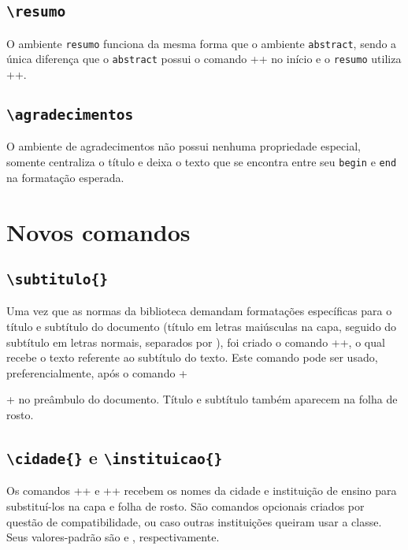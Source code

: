 \documentclass[xindy,draft]{fei}
\begin{document}
    \subsection{\texttt{\textbackslash resumo}}
    O ambiente \texttt{resumo} funciona da mesma forma que o ambiente \texttt{abstract}, sendo a única diferença que o \texttt{abstract} possui o comando \latexinline++ no início e o \texttt{resumo} utiliza \latexinline++.

    \subsection{\texttt{\textbackslash agradecimentos}}
    O ambiente de agradecimentos não possui nenhuma propriedade especial, somente centraliza o título e deixa o texto que se encontra entre seu \texttt{begin} e \texttt{end} na formatação esperada.

\section{Novos comandos}
    
    \subsection{\texttt{\textbackslash subtitulo\{\}}}
    Uma vez que as normas da biblioteca demandam formatações específicas para o título e subtítulo do documento (título em letras maiúsculas na capa, seguido do subtítulo em letras normais, separados por \aspas{:}), foi criado o comando \latexinline+\subtitulo{}+, o qual recebe o texto referente ao subtítulo do texto. Este comando pode ser usado, preferencialmente, após o comando \latexinline+\title{}+ no preâmbulo do documento. Título e subtítulo também aparecem na folha de rosto.
    
    \subsection{\texttt{\textbackslash cidade\{\}} e \texttt{\textbackslash instituicao\{\}}}
    Os comandos \latexinline+\cidade{}+ e \latexinline+\instituicao{}+ recebem os nomes da cidade e instituição de ensino para substituí-los na capa e folha de rosto. São comandos opcionais criados por questão de compatibilidade, ou caso outras instituições queiram usar a classe. Seus valores-padrão são  e , respectivamente.
    
\end{document}
